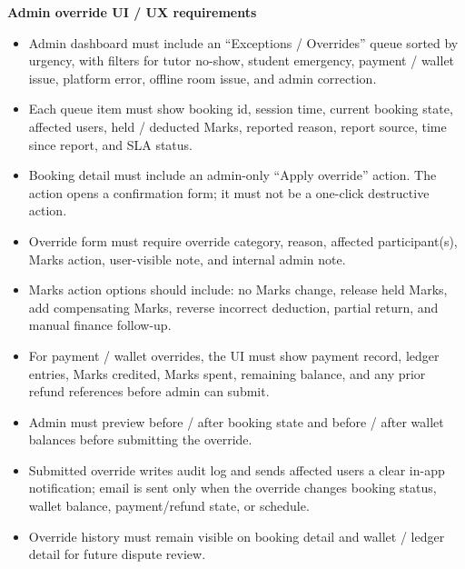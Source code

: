 \documentclass[11pt,a4paper]{article}
\begin{document}
\textbf{Admin override UI / UX requirements}
\begin{itemize}
    \item Admin dashboard must include an ``Exceptions / Overrides'' queue sorted by urgency, with filters for tutor no-show, student emergency, payment / wallet issue, platform error, offline room issue, and admin correction.
    \item Each queue item must show booking id, session time, current booking state, affected users, held / deducted Marks, reported reason, report source, time since report, and SLA status.
    \item Booking detail must include an admin-only ``Apply override'' action. The action opens a confirmation form; it must not be a one-click destructive action.
    \item Override form must require override category, reason, affected participant(s), Marks action, user-visible note, and internal admin note.
    \item Marks action options should include: no Marks change, release held Marks, add compensating Marks, reverse incorrect deduction, partial return, and manual finance follow-up.
    \item For payment / wallet overrides, the UI must show payment record, ledger entries, Marks credited, Marks spent, remaining balance, and any prior refund references before admin can submit.
    \item Admin must preview before / after booking state and before / after wallet balances before submitting the override.
    \item Submitted override writes audit log and sends affected users a clear in-app notification; email is sent only when the override changes booking status, wallet balance, payment/refund state, or schedule.
    \item Override history must remain visible on booking detail and wallet / ledger detail for future dispute review.
\end{itemize}
\end{document}
